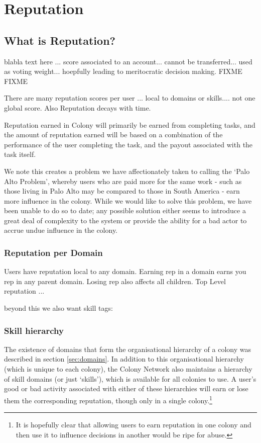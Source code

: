 \section{Reputation}
\subsection{What is Reputation?}
blabla text here ... score associated to an account... cannot be transferred... used as voting weight... hoepfully leading to meritocratic decision making.
FIXME FIXME

There are many reputation scores per user ... local to domains or skills.... not one global score. Also Reputation decays with time.



Reputation earned in Colony will primarily be earned from completing tasks, and the amount of reputation earned will be based on a combination of the performance of the user completing the task, and the payout associated with the task itself.

We note this creates a problem we have affectionately taken to calling the ‘Palo Alto Problem’, whereby users who are paid more for the same work - such as those living in Palo Alto may be compared to those in South America - earn more influence in the colony. While we would like to solve this problem, we have been unable to do so to date; any possible solution either seems to introduce a great deal of complexity to the system or provide the ability for a bad actor to accrue undue influence in the colony.
\subsubsection{Reputation per Domain}
Users have reputation local to any domain. Earning rep in a domain earns you rep in any parent domain. Losing rep also affects all children.
Top Level reputation ...

beyond this we also want skill tags:

\subsubsection{Skill hierarchy}

The existence of domains that form the organisational hierarchy of a colony was described in section \ref{sec:domains}. In addition to this organisational hierarchy (which is unique to each colony), the Colony Network also maintains a hierarchy of skill domains (or just `skills'), which is available for all colonies to use. A user's good or bad activity associated with either of these hierarchies will earn or lose them the corresponding reputation, though only in a single colony.\footnote{It is hopefully clear that allowing users to earn reputation in one colony and then use it to influence decisions in another would be ripe for abuse.}

